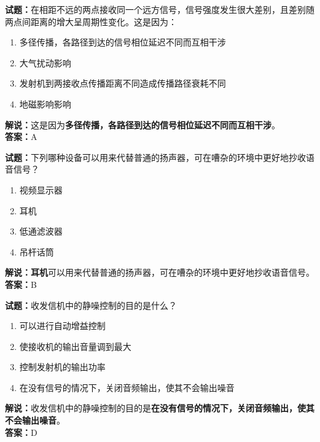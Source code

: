 \documentclass{ctexbook}
\begin{document}
\bigskip


\noindent\textbf{试题：}在相距不远的两点接收同一个远方信号，信号强度发生很大差别，且差别随两点间距离的增大呈周期性变化。这是因为：
\begin{enumerate}[leftmargin=3em]
\item 多径传播，各路径到达的信号相位延迟不同而互相干涉
\item 大气扰动影响
\item 发射机到两接收点传播距离不同造成传播路径衰耗不同
\item 地磁影响影响
\end{enumerate}
\noindent\textbf{解说：}这是因为\textbf{多径传播，各路径到达的信号相位延迟不同而互相干涉}。\\\noindent\textbf{答案：}A



\bigskip


\noindent\textbf{试题：}下列哪种设备可以用来代替普通的扬声器，可在嘈杂的环境中更好地抄收语音信号？
\begin{enumerate}[leftmargin=3em]
\item 视频显示器
\item 耳机
\item 低通滤波器
\item 吊杆话筒
\end{enumerate}
\noindent\textbf{解说：耳机}可以用来代替普通的扬声器，可在嘈杂的环境中更好地抄收语音信号。\\\noindent\textbf{答案：}B



\bigskip


\noindent\textbf{试题：}收发信机中的静噪控制的目的是什么？
\begin{enumerate}[leftmargin=3em]
\item 可以进行自动增益控制
\item 使接收机的输出音量调到最大
\item 控制发射机的输出功率
\item 在没有信号的情况下，关闭音频输出，使其不会输出噪音%
\end{enumerate}
\noindent\textbf{解说：}收发信机中的静噪控制的目的是\textbf{在没有信号的情况下，关闭音频输出，使其不会输出噪音}。\\\noindent\textbf{答案：}D




\bigskip
\end{document}
